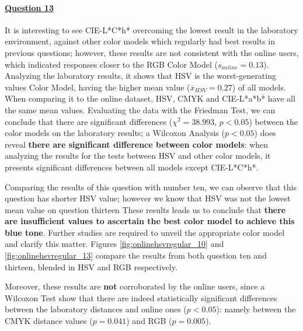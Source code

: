 \paragraph{\ul{Question 13}}
%
It is interesting to see CIE-L*C*h* overcoming the lowest result in the laboratory environment, against other color models which regularly had best results in previous questions; however, these results are not consistent with the online users, which indicated responses closer to the RGB Color Model
($s_{online} = 0.13$).
Analyzing the laboratory results, it shows that HSV is the worst-generating values Color Model, having the higher mean value ($\overline{x}_{HSV} = 0.27$) of all models. When comparing it to the online dataset,
HSV, CMYK and CIE-L*a*b* have all the same mean values. Evaluating the data with the Friedman Test, we can conclude that there are significant differences ($\chi^2 = 38.993$, $p < 0.05$)
between the color models on the laboratory results; a Wilcoxon Analysis ($p < 0.05$) does reveal \textbf{there are significant difference between color models}: when analyzing the results for the tests between HSV and other
color models, it presents significant differences between all models except CIE-L*C*h*. \par
%
Comparing the results of this question with number ten, we can observe that this question has shorter HSV value; however we know that HSV was not the lowest mean value on question thirteen
These results leads us to conclude that \textbf{there are insufficient values to ascertain the best color model to achieve this blue tone}. Further studies are required to unveil the
appropriate color model and clarify this matter. Figures \ref{fig:onlinehsvregular_10} and \ref{fig:onlinehsvregular_13} compare the results from both question ten and thirteen, blended in HSV and RGB respectively. \par
%
Moreover, these results are \textbf{not} corroborated by the online users, since a Wilcoxon Test show that there are indeed statistically significant differences between the laboratory distances
and online ones ($p < 0.05$): namely between the CMYK distance values ($p = 0.041$) and RGB ($p = 0.005$).
%
